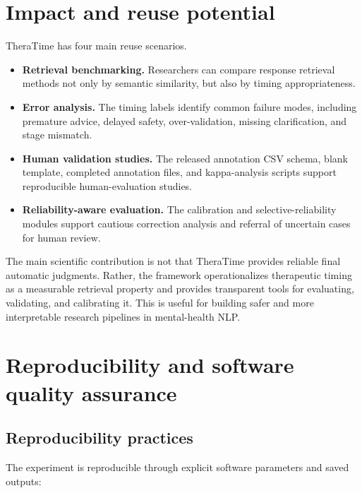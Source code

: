 \documentclass[preprint,12pt,a4paper]{elsarticle}
\begin{document}
\FloatBarrier

\section{Impact and reuse potential}
\label{sec:impact}

TheraTime has four main reuse scenarios.

\begin{itemize}
    \item \textbf{Retrieval benchmarking.} Researchers can compare response retrieval methods not only by semantic similarity, but also by timing appropriateness.
    \item \textbf{Error analysis.} The timing labels identify common failure modes, including premature advice, delayed safety, over-validation, missing clarification, and stage mismatch.
    \item \textbf{Human validation studies.} The released annotation CSV schema, blank template, completed annotation files, and kappa-analysis scripts support reproducible human-evaluation studies.
    \item \textbf{Reliability-aware evaluation.} The calibration and selective-reliability modules support cautious correction analysis and referral of uncertain cases for human review.
\end{itemize}

The main scientific contribution is not that TheraTime provides reliable final automatic judgments. Rather, the framework operationalizes therapeutic timing as a measurable retrieval property and provides transparent tools for evaluating, validating, and calibrating it. This is useful for building safer and more interpretable research pipelines in mental-health NLP.

\FloatBarrier

\section{Reproducibility and software quality assurance}
\label{sec:repro_qa}

\subsection{Reproducibility practices}

The experiment is reproducible through explicit software parameters and saved outputs:
\end{document}
